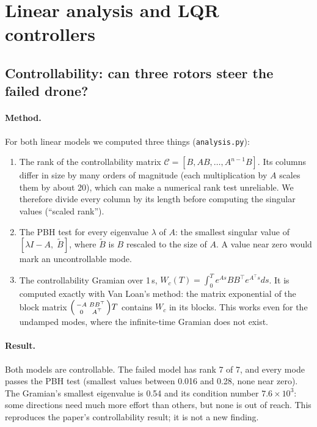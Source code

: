 \section{Linear analysis and LQR controllers}\label{sec:linear}
\subsection{Controllability: can three rotors steer the failed drone?}
\paragraph{Method.} For both linear models we computed three things (\texttt{analysis.py}):
\begin{enumerate}
  \item The rank of the controllability matrix $\mathcal C = [B, AB, \dots, A^{n-1}B]$. Its columns differ in size by many orders of magnitude (each multiplication by $A$ scales them by about 20), which can make a numerical rank test unreliable. We therefore divide every column by its length before computing the singular values (``scaled rank'').
  \item The PBH test for every eigenvalue $\lambda$ of $A$: the smallest singular value of $[\lambda I - A,\; \tilde B]$, where $\tilde B$ is $B$ rescaled to the size of $A$. A value near zero would mark an uncontrollable mode.
  \item The controllability Gramian over 1\,s, $W_c(T) = \int_0^T e^{As}BB^\top e^{A^\top s}ds$. It is computed exactly with Van Loan's method: the matrix exponential of the block matrix $\begin{psmallmatrix}-A & BB^\top\\ 0 & A^\top\end{psmallmatrix}T$ contains $W_c$ in its blocks. This works even for the undamped modes, where the infinite-time Gramian does not exist.
\end{enumerate}

\paragraph{Result.} Both models are controllable. The failed model has rank 7 of 7, and every mode passes the PBH test (smallest values between 0.016 and 0.28, none near zero). The Gramian's smallest eigenvalue is 0.54 and its condition number $7.6\times10^3$: some directions need much more effort than others, but none is out of reach. This reproduces the paper's controllability result; it is not a new finding.

